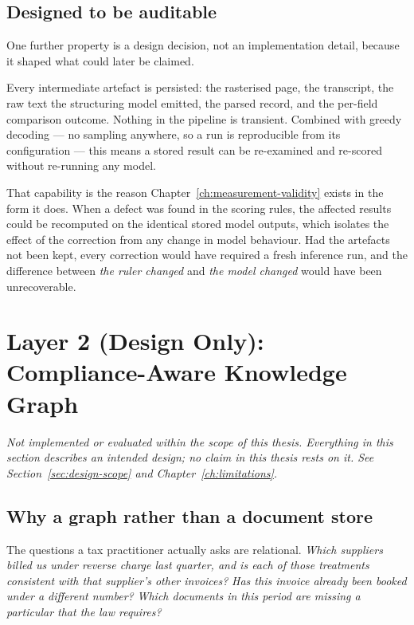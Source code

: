 \subsection{Designed to be auditable}
\label{sec:design-audit}

One further property is a design decision, not an implementation detail, because it
shaped what could later be claimed.

Every intermediate artefact is persisted: the rasterised page, the transcript, the raw text the
structuring model emitted, the parsed record, and the per-field comparison outcome. Nothing in
the pipeline is transient. Combined with greedy decoding --- no sampling anywhere, so a run is
reproducible from its configuration --- this means a stored result can be re-examined and
re-scored without re-running any model.

That capability is the reason Chapter~\ref{ch:measurement-validity} exists in the form it does.
When a defect was found in the scoring rules, the affected results could be recomputed on the
identical stored model outputs, which isolates the effect of the correction from any change in
model behaviour. Had the artefacts not been kept, every correction would have required a fresh
inference run, and the difference between \emph{the ruler changed} and \emph{the model changed}
would have been unrecoverable.

\section{Layer 2 (Design Only): Compliance-Aware Knowledge Graph}
\label{sec:design-layer2}

\emph{Not implemented or evaluated within the scope of this thesis. Everything in this section
describes an intended design; no claim in this thesis rests on it. See
Section~\ref{sec:design-scope} and Chapter~\ref{ch:limitations}.}

\subsection{Why a graph rather than a document store}

The questions a tax practitioner actually asks are relational. \emph{Which suppliers billed us
under reverse charge last quarter, and is each of those treatments consistent with that
supplier's other invoices?} \emph{Has this invoice already been booked under a different
number?} \emph{Which documents in this period are missing a particular that the law requires?}

